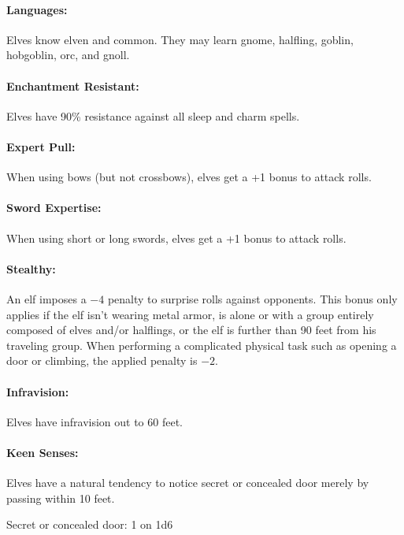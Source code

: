 \begin{multicols}{2}
\paragraph{Languages:} Elves know elven and common.  They may learn gnome, halfling, goblin, hobgoblin, orc, and gnoll. 

\paragraph{Enchantment Resistant:} Elves have 90\% resistance against all sleep and charm spells. 

\paragraph{Expert Pull:} When using bows (but not crossbows), elves get a +1 bonus to attack rolls.

\paragraph{Sword Expertise:} When using short or long swords, elves get a +1 bonus to attack rolls.

\paragraph{Stealthy:} An elf imposes a $-4$ penalty to surprise rolls against opponents.  This bonus only applies if the elf isn't wearing metal armor, is alone or with a group entirely composed of elves and/or halflings, or the elf is further than 90 feet from his traveling group.  When performing a complicated physical task such as opening a door or climbing, the applied penalty is $-2$. 

\paragraph{Infravision:} Elves have infravision out to 60 feet.

\paragraph{Keen Senses:} Elves have a natural tendency to notice secret or concealed door merely by passing within 10 feet.

Secret or concealed door: 1 on 1d6


\end{multicols}
